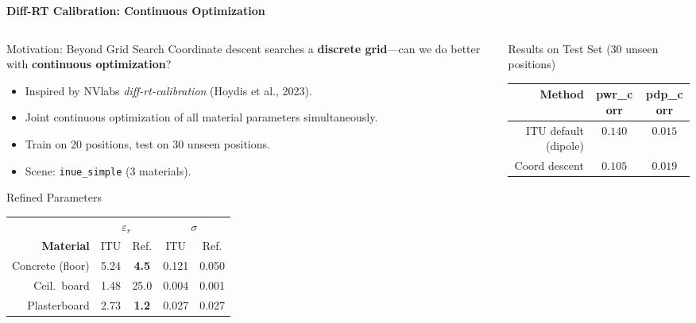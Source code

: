 \documentclass[
    aspectratio=169
]{beamer}
\begin{document}
\begin{frame}{\textbf{Diff-RT Calibration: Continuous Optimization}}
\vspace{-0.2cm}
\begin{columns}[T]
\begin{column}{0.48\textwidth}
\begin{block}{\footnotesize Motivation: Beyond Grid Search}
\footnotesize
Coordinate descent searches a \textbf{discrete grid}---can we do better with \textbf{continuous optimization}?
\vspace{0.1cm}
\begin{itemize}
    \item Inspired by NVlabs \emph{diff-rt-calibration} (Hoydis et al., 2023).
    \item Joint continuous optimization of all material parameters simultaneously.
    \item Train on 20 positions, test on 30 unseen positions.
    \item Scene: \texttt{inue\_simple} (3 materials).
\end{itemize}
\end{block}
\vspace{0.1cm}
\begin{block}{\footnotesize Refined Parameters}
\scriptsize
\begin{tabular}{rcccc}
\toprule
& \multicolumn{2}{c}{$\varepsilon_r$} & \multicolumn{2}{c}{$\sigma$} \\
\cmidrule(lr){2-3}\cmidrule(lr){4-5}
\textbf{Material} & ITU & Ref. & ITU & Ref. \\
\midrule
Concrete (floor) & 5.24 & \textbf{4.5} & 0.121 & 0.050 \\
Ceil.\ board & 1.48 & 25.0 & 0.004 & 0.001 \\
Plasterboard & 2.73 & \textbf{1.2} & 0.027 & 0.027 \\
\bottomrule
\end{tabular}
\end{block}
\end{column}
\begin{column}{0.48\textwidth}
\begin{block}{\footnotesize Results on Test Set (30 unseen positions)}
\scriptsize
\begin{tabular}{rcc}
\toprule
\textbf{Method} & \textbf{pwr\_corr} & \textbf{pdp\_corr} \\
\midrule
ITU default (dipole) & $0.140$ & $0.015$ \\
Coord descent & $0.105$ & $0.019$ \\

\end{tabular}
\end{block}
\end{column}
\end{columns}
\end{frame}
\end{document}

